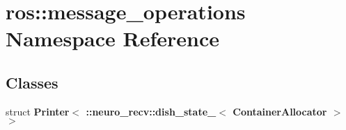 \section{ros\-:\-:message\-\_\-operations \-Namespace \-Reference}
\label{namespaceros_1_1message__operations}
\subsection*{\-Classes}
\begin{DoxyCompactItemize}
\item 
struct {\bf \-Printer$<$ \-::neuro\-\_\-recv\-::dish\-\_\-state\-\_\-$<$ Container\-Allocator $>$ $>$}
\end{DoxyCompactItemize}

